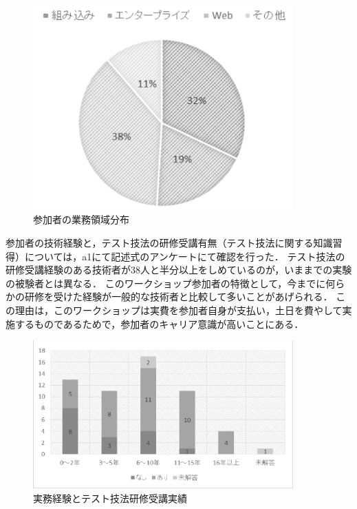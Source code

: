 \begin{figure}[H]
\begin{center}
\includegraphics[width=10cm]{./image/D-3-Fig7.png}
\caption{参加者の業務領域分布}
\label{fig:D-3-Fig7}
\end{center}
\end{figure}

参加者の技術経験と，テスト技法の研修受講有無（テスト技法に関する知識習得）については，a1にて記述式のアンケートにて確認を行った．
テスト技法の研修受講経験のある技術者が38人と半分以上をしめているのが，いままでの実験の被験者とは異なる．
このワークショップ参加者の特徴として，今までに何らかの研修を受けた経験が一般的な技術者と比較して多いことがあげられる．
この理由は，このワークショップは実費を参加者自身が支払い，土日を費やして実施するものであるためで，参加者のキャリア意識が高いことにある．

\begin{figure}[H]
\begin{center}
\includegraphics[width=10cm]{./image/D-3-Fig7b.png}
\caption{実務経験とテスト技法研修受講実績}
\label{fig:D-3-Fig7b}
\end{center}
\end{figure}



